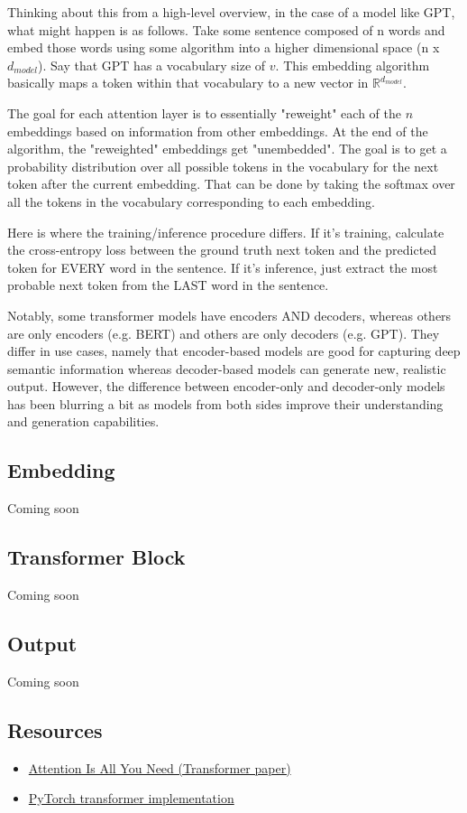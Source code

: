 \documentclass[12pt]{article}
\begin{document}
Thinking about this from a high-level overview, in the case of a model like GPT, what might happen is as follows. Take some sentence composed of n words and embed those words using some algorithm into a higher dimensional space (n x $d_{model}$). Say that GPT has a vocabulary size of $v$. This embedding algorithm basically maps a token within that vocabulary to a new vector in $\mathbb{R}^{d_{model}}$.

The goal for each attention layer is to essentially "reweight" each of the $n$ embeddings based on information from other embeddings. At the end of the algorithm, the "reweighted" embeddings get "unembedded". The goal is to get a probability distribution over all possible tokens in the vocabulary for the next token after the current embedding. That can be done by taking the softmax over all the tokens in the vocabulary corresponding to each embedding. 

Here is where the training/inference procedure differs. If it's training, calculate the cross-entropy loss between the ground truth next token and the predicted token for EVERY word in the sentence. If it's inference, just extract the most probable next token from the LAST word in the sentence. 

Notably, some transformer models have encoders AND decoders, whereas others are only encoders (e.g. BERT) and others are only decoders (e.g. GPT). They differ in use cases, namely that encoder-based models are good for capturing deep semantic information whereas decoder-based models can generate new, realistic output. However, the difference between encoder-only and decoder-only models has been blurring a bit as models from both sides improve their understanding and generation capabilities. 

\subsection{Embedding}
Coming soon
\subsection{Transformer Block}
Coming soon
\subsection{Output}
Coming soon
\subsection{Resources}
\begin{itemize}
  \item \href{https://arxiv.org/pdf/1706.03762}{Attention Is All You Need (Transformer paper)}
  
  \item \href{https://github.com/hyunwoongko/transformer}{PyTorch transformer implementation}
\end{itemize}
\end{document}
